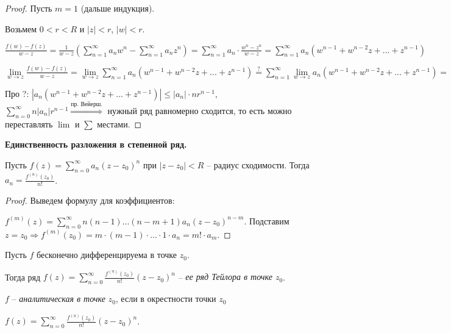 \begin{proof}
    Пусть $m=1$ (дальше индукция). 
    
    Возьмем $0<r<R$ и $|z|<r$, $|w|<r$.

    $\frac{f(w)-f(z)}{w-z}=\frac{1}{w-z}(\sum\limits_{n=1}^\infty a_nw^n - \sum\limits_{n=1}^\infty a_nz^n)=\sum\limits_{n=1}^\infty a_n\cdot \frac{w^n-z^n}{w-z}=\sum\limits_{n=1}^\infty a_n(w^{n-1}+w^{n-2}z+...+z^{n-1})$

    $\lim\limits_{w\rightarrow z}\frac{f(w)-f(z)}{w-z}=\lim\limits_{w\rightarrow z}\sum\limits_{n=1}^\infty a_n(w^{n-1}+w^{n-2}z+...+z^{n-1})\overset{?}{=}\sum\limits_{n=1}^\infty\lim\limits_{w\rightarrow z}a_n(w^{n-1}+w^{n-2}z+...+z^{n-1})=\sum\limits_{n=1}^\infty a_nnz^{n-1}$

    Про ?: $|a_n(w^{n-1}+w^{n-2}z+...+z^{n-1})|\leq |a_n|\cdot nr^{n-1}$, $\sum\limits_{n=0}^\infty n|a_n|r^{n-1}\overset{\text{пр. Вейерш.}}{\Rightarrow}$ нужный ряд равномерно сходится, то есть можно переставлять $\lim$ и $\sum$ местами.
\end{proof}

\begin{theorem}
    \textbf{Единственность разложения в степенной ряд.}

    Пусть $f(z)=\sum\limits_{n=0}^\infty a_n(z-z_0)^n$ при $|z-z_0|<R$ – радиус сходимости. Тогда $a_n=\frac{f^{(n)}(z_0)}{n!}$.
\end{theorem}

\begin{proof}
    Выведем формулу для коэффициентов:

    $f^{(m)}(z)=\sum\limits_{n=0}^\infty n(n-1)...(n-m+1)a_n(z-z_0)^{n-m}$. Подставим $z=z_0\Rightarrow f^{(m)}(z_0)=m\cdot(m-1)\cdot...\cdot1\cdot a_n=m!\cdot a_m$.
\end{proof}

\begin{definition}
    Пусть $f$ бесконечно дифференцируема в точке $z_0$. 
    
    Тогда ряд $f(z)=\sum\limits_{n=0}^\infty\frac{f^{(n)}(z_0)}{n!}
    (z-z_0)^n$ – \textit{ее ряд Тейлора в точке $z_0$}.
\end{definition}

\begin{definition}
    $f$ – \textit{аналитическая в точке} $z_0$, если в окрестности точки $z_0$ 
    
    $f(z)=\sum\limits_{n=0}^\infty\frac{f^{(n)}(z_0)}{n!}(z-z_0)^n$. 
\end{definition}

